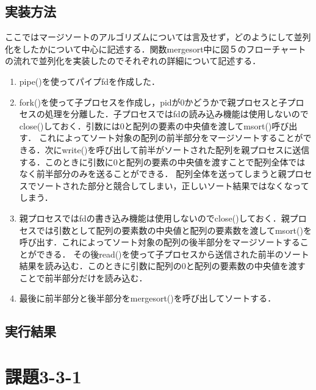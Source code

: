\documentclass[dvipdfmx]{jarticle}
\begin{document}
\subsection{実装方法}
ここではマージソートのアルゴリズムについては言及せず，どのようにして並列化をしたかについて中心に記述する．関数mergesort中に図５のフローチャートの流れで並列化を実装したのでそれぞれの詳細について記述する．
\begin{enumerate}
    \item pipe()を使ってパイプfdを作成した．
    \item fork()を使って子プロセスを作成し，pidが0かどうかで親プロセスと子プロセスの処理を分離した．子プロセスではfdの読み込み機能は使用しないのでclose()しておく．引数には0と配列の要素の中央値を渡してmsort()呼び出す．
    これによってソート対象の配列の前半部分をマージソートすることができる．次にwrite()を呼び出して前半がソートされた配列を親プロセスに送信する．このときに引数に0と配列の要素の中央値を渡すことで配列全体ではなく前半部分のみを送ることができる．
    配列全体を送ってしまうと親プロセスでソートされた部分と競合してしまい，正しいソート結果ではなくなってしまう．
    \item 親プロセスではfdの書き込み機能は使用しないのでclose()しておく．親プロセスでは引数として配列の要素数の中央値と配列の要素数を渡してmsort()を呼び出す．これによってソート対象の配列の後半部分をマージソートすることができる．
    その後read()を使って子プロセスから送信された前半のソート結果を読み込む．このときに引数に配列の0と配列の要素数の中央値を渡すことで前半部分だけを読み込む．
    \item 最後に前半部分と後半部分をmergesort()を呼び出してソートする．
\end{enumerate}
\subsection{実行結果}
\section{課題3-3-1}
\end{document}
